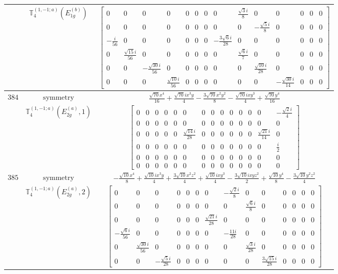 \documentclass[fleqn,8pt,landscape]{jsarticle}
\begin{document}
\begin{longtable}{ccc}
$  $ & $ \mathbb{T}_{4}^{(1,-1;a)}(E_{1g}^{(b)}) $ & $ \begin{bmatrix} 0 & 0 & 0 & 0 & 0 & 0 & 0 & 0 & \frac{\sqrt{3} i}{8} & 0 & 0 & 0 & 0 & 0 \\ 0 & 0 & 0 & 0 & 0 & 0 & 0 & 0 & 0 & - \frac{\sqrt{5} i}{8} & 0 & 0 & 0 & 0 \\ - \frac{i}{56} & 0 & 0 & 0 & 0 & 0 & 0 & - \frac{3 \sqrt{6} i}{28} & 0 & 0 & 0 & 0 & 0 & 0 \\ 0 & \frac{\sqrt{15} i}{56} & 0 & 0 & 0 & 0 & 0 & 0 & \frac{\sqrt{6} i}{7} & 0 & 0 & 0 & 0 & 0 \\ 0 & 0 & - \frac{\sqrt{30} i}{56} & 0 & 0 & 0 & 0 & 0 & 0 & \frac{\sqrt{10} i}{28} & 0 & 0 & 0 & 0 \\ 0 & 0 & 0 & \frac{\sqrt{10} i}{56} & 0 & 0 & 0 & 0 & 0 & 0 & - \frac{\sqrt{30} i}{14} & 0 & 0 & 0 \end{bmatrix} $ \\ \hline
$ 384 $ & $ \text{symmetry} $ & $ \frac{\sqrt{70} x^{4}}{16} + \frac{\sqrt{70} i x^{3} y}{4} - \frac{3 \sqrt{70} x^{2} y^{2}}{8} - \frac{\sqrt{70} i x y^{3}}{4} + \frac{\sqrt{70} y^{4}}{16} $ \\
$  $ & $ \mathbb{T}_{4}^{(1,-1;a)}(E_{2g}^{(a)},1) $ & $ \begin{bmatrix} 0 & 0 & 0 & 0 & 0 & 0 & 0 & 0 & 0 & 0 & 0 & 0 & 0 & - \frac{\sqrt{2} i}{4} \\ 0 & 0 & 0 & 0 & 0 & 0 & 0 & 0 & 0 & 0 & 0 & 0 & 0 & 0 \\ 0 & 0 & 0 & 0 & 0 & \frac{\sqrt{14} i}{28} & 0 & 0 & 0 & 0 & 0 & 0 & \frac{\sqrt{21} i}{14} & 0 \\ 0 & 0 & 0 & 0 & 0 & 0 & 0 & 0 & 0 & 0 & 0 & 0 & 0 & \frac{i}{2} \\ 0 & 0 & 0 & 0 & 0 & 0 & 0 & 0 & 0 & 0 & 0 & 0 & 0 & 0 \\ 0 & 0 & 0 & 0 & 0 & 0 & 0 & 0 & 0 & 0 & 0 & 0 & 0 & 0 \end{bmatrix} $ \\ \hline
$ 385 $ & $ \text{symmetry} $ & $ - \frac{\sqrt{10} x^{4}}{8} + \frac{\sqrt{10} i x^{3} y}{4} + \frac{3 \sqrt{10} x^{2} z^{2}}{4} + \frac{\sqrt{10} i x y^{3}}{4} - \frac{3 \sqrt{10} i x y z^{2}}{2} + \frac{\sqrt{10} y^{4}}{8} - \frac{3 \sqrt{10} y^{2} z^{2}}{4} $ \\
$  $ & $ \mathbb{T}_{4}^{(1,-1;a)}(E_{2g}^{(a)},2) $ & $ \begin{bmatrix} 0 & 0 & 0 & 0 & 0 & 0 & 0 & - \frac{\sqrt{2} i}{8} & 0 & 0 & 0 & 0 & 0 & 0 \\ 0 & 0 & 0 & 0 & 0 & 0 & 0 & 0 & \frac{\sqrt{6} i}{8} & 0 & 0 & 0 & 0 & 0 \\ 0 & 0 & 0 & 0 & 0 & 0 & \frac{\sqrt{21} i}{28} & 0 & 0 & 0 & 0 & 0 & 0 & 0 \\ - \frac{\sqrt{6} i}{56} & 0 & 0 & 0 & 0 & 0 & 0 & - \frac{11 i}{28} & 0 & 0 & 0 & 0 & 0 & 0 \\ 0 & \frac{\sqrt{30} i}{56} & 0 & 0 & 0 & 0 & 0 & 0 & \frac{\sqrt{3} i}{28} & 0 & 0 & 0 & 0 & 0 \\ 0 & 0 & - \frac{\sqrt{5} i}{28} & 0 & 0 & 0 & 0 & 0 & 0 & \frac{3 \sqrt{15} i}{28} & 0 & 0 & 0 & 0 \end{bmatrix} $ \\ \hline

\end{longtable}
\end{document}
